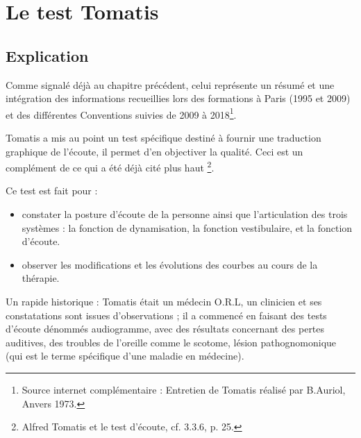 \chapter{Le test Tomatis}

\section{Explication}

Comme signalé déjà au chapitre précédent, celui représente un résumé et une intégration des
 informations recueillies lors des formations à Paris (1995 et 2009) et des différentes
  Conventions suivies de 2009 à 2018\footnote{Source internet complémentaire  : 
  	Entretien de Tomatis réalisé par B.Auriol, Anvers 1973.}.

Tomatis a mis au point un test spécifique destiné à fournir une traduction
graphique de l'écoute, il permet d'en objectiver la qualité. Ceci est un complément de ce
 qui a été déjà cité plus haut%
 \footnote{Alfred Tomatis et le test d'écoute, cf. 3.3.6, p. 25.}.
 

Ce test est fait pour :
\begin{itemize}
\item constater la posture d'écoute de la personne ainsi que l'articulation
des trois systèmes : la fonction de dynamisation, la fonction vestibulaire,
et la fonction d'écoute.
\item observer les modifications et les évolutions des courbes au cours
de la thérapie.
\end{itemize}
Un rapide historique : Tomatis était un médecin O.R.L, un clinicien et  ses constatations
sont issues d'observations ; il a commencé en faisant
des tests d'écoute dénommés audiogramme, avec des résultats concernant  des pertes auditives, des troubles de l'oreille
comme le scotome, lésion pathognomonique (qui est le terme spécifique
d'une maladie en médecine). 


